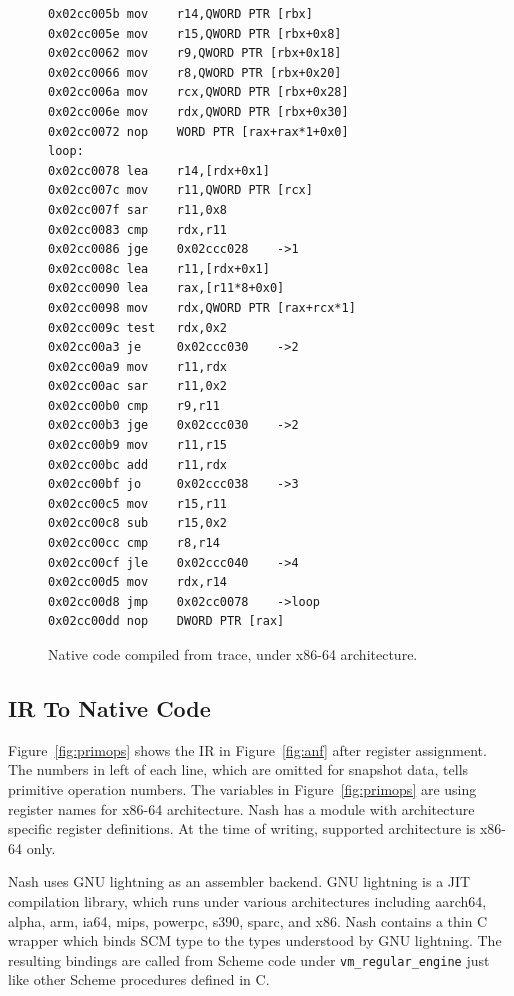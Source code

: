 \documentclass[preprint, 10pt]{sigplanconf}
\begin{document}
\begin{figure}
  \centering
  \small
\begin{verbatim}
0x02cc005b mov    r14,QWORD PTR [rbx]
0x02cc005e mov    r15,QWORD PTR [rbx+0x8]
0x02cc0062 mov    r9,QWORD PTR [rbx+0x18]
0x02cc0066 mov    r8,QWORD PTR [rbx+0x20]
0x02cc006a mov    rcx,QWORD PTR [rbx+0x28]
0x02cc006e mov    rdx,QWORD PTR [rbx+0x30]
0x02cc0072 nop    WORD PTR [rax+rax*1+0x0]
loop:
0x02cc0078 lea    r14,[rdx+0x1]
0x02cc007c mov    r11,QWORD PTR [rcx]
0x02cc007f sar    r11,0x8
0x02cc0083 cmp    rdx,r11
0x02cc0086 jge    0x02ccc028    ->1
0x02cc008c lea    r11,[rdx+0x1]
0x02cc0090 lea    rax,[r11*8+0x0]
0x02cc0098 mov    rdx,QWORD PTR [rax+rcx*1]
0x02cc009c test   rdx,0x2
0x02cc00a3 je     0x02ccc030    ->2
0x02cc00a9 mov    r11,rdx
0x02cc00ac sar    r11,0x2
0x02cc00b0 cmp    r9,r11
0x02cc00b3 jge    0x02ccc030    ->2
0x02cc00b9 mov    r11,r15
0x02cc00bc add    r11,rdx
0x02cc00bf jo     0x02ccc038    ->3
0x02cc00c5 mov    r15,r11
0x02cc00c8 sub    r15,0x2
0x02cc00cc cmp    r8,r14
0x02cc00cf jle    0x02ccc040    ->4
0x02cc00d5 mov    rdx,r14
0x02cc00d8 jmp    0x02cc0078    ->loop
0x02cc00dd nop    DWORD PTR [rax]
\end{verbatim}
\caption{Native code compiled from trace, under x86-64 architecture.}
\label{fig:ncode}
\end{figure}

\subsection{IR To Native Code}

Figure~\hyperref[fig:primops]{\ref{fig:primops}} shows the IR in
Figure~\hyperref[fig:anf]{\ref{fig:anf}} after register assignment. The
numbers in left of each line, which are omitted for snapshot data, tells
primitive operation numbers. The variables in
Figure~\hyperref[fig:primops]{\ref{fig:primops}} are using register names for
x86-64 architecture. Nash has a module with architecture specific register
definitions. At the time of writing, supported architecture is x86-64 only.

Nash uses GNU lightning as an assembler backend. GNU lightning is a JIT
compilation library, which runs under various architectures including aarch64,
alpha, arm, ia64, mips, powerpc, s390, sparc, and x86. Nash contains a thin C
wrapper which binds SCM type to the types understood by GNU lightning. The
resulting bindings are called from Scheme code under
\texttt{vm\_regular\_engine} just like other Scheme procedures defined in C.
\end{document}
